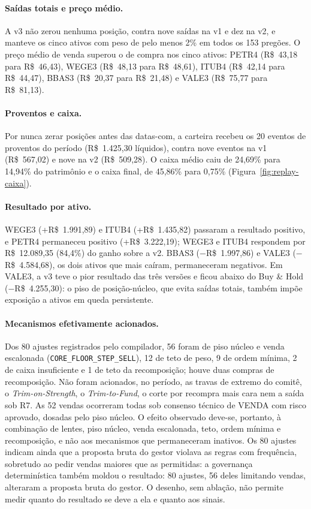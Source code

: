 \paragraph*{Saídas totais e preço médio.} A v3 não zerou nenhuma posição, contra nove saídas na v1 e dez na v2, e manteve os cinco ativos com peso de pelo menos 2\% em todos os 153 pregões. O preço médio de venda superou o de compra nos cinco ativos: PETR4 (R\$~43,18 para R\$~46,43), WEGE3 (R\$~48,13 para R\$~48,61), ITUB4 (R\$~42,14 para R\$~44,47), BBAS3 (R\$~20,37 para R\$~21,48) e VALE3 (R\$~75,77 para R\$~81,13).

\paragraph*{Proventos e caixa.} Por nunca zerar posições antes das datas-com, a carteira recebeu os 20 eventos de proventos do período (R\$~1.425,30 líquidos), contra nove eventos na v1 (R\$~567,02) e nove na v2 (R\$~509,28). O caixa médio caiu de 24,69\% para 14,94\% do patrimônio e o caixa final, de 45,86\% para 0,75\% (Figura~\ref{fig:replay-caixa}).

\paragraph*{Resultado por ativo.} WEGE3 (+R\$~1.991,89) e ITUB4 (+R\$~1.435,82) passaram a resultado positivo, e PETR4 permaneceu positivo (+R\$~3.222,19); WEGE3 e ITUB4 respondem por R\$~12.089,35 (84,4\%) do ganho sobre a v2. BBAS3 ($-$R\$~1.997,86) e VALE3 ($-$R\$~4.584,68), os dois ativos que mais caíram, permaneceram negativos. Em VALE3, a v3 teve o pior resultado das três versões e ficou abaixo do Buy \& Hold ($-$R\$~4.255,30): o piso de posição-núcleo, que evita saídas totais, também impõe exposição a ativos em queda persistente.

\paragraph*{Mecanismos efetivamente acionados.} Dos 80 ajustes registrados pelo compilador, 56 foram de piso núcleo e venda escalonada (\texttt{CORE\_FLOOR\_STEP\_SELL}), 12 de teto de peso, 9 de ordem mínima, 2 de caixa insuficiente e 1 de teto da recomposição; houve duas compras de recomposição. Não foram acionados, no período, as travas de extremo do comitê, o \textit{Trim-on-Strength}, o \textit{Trim-to-Fund}, o corte por recompra mais cara nem a saída sob R7. As 52 vendas ocorreram todas sob consenso técnico de VENDA com risco aprovado, dosadas pelo piso núcleo. O efeito observado deve-se, portanto, à combinação de lentes, piso núcleo, venda escalonada, teto, ordem mínima e recomposição, e não aos mecanismos que permaneceram inativos. Os 80 ajustes indicam ainda que a proposta bruta do gestor violava as regras com frequência, sobretudo ao pedir vendas maiores que as permitidas: a governança determinística também moldou o resultado: 80 ajustes, 56 deles limitando vendas, alteraram a proposta bruta do gestor. O desenho, sem ablação, não permite medir quanto do resultado se deve a ela e quanto aos sinais.

